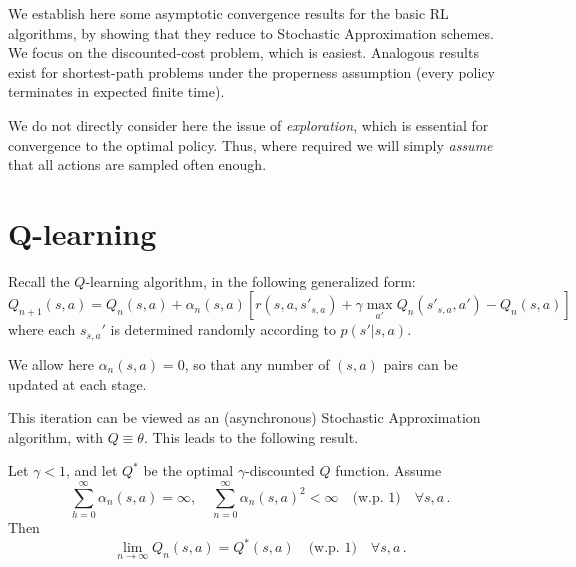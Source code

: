 %
%
%
%
%
%
%
%
%

We establish here some asymptotic convergence results for the basic
RL algorithms, by showing that they reduce to Stochastic Approximation
schemes. We focus on the discounted-cost problem, which is easiest.
Analogous results exist for shortest-path problems under the properness assumption (every policy
terminates in expected finite time).

We do not directly consider here the issue of {\em exploration},
which is essential for convergence to the optimal policy. Thus, where
required we will simply {\em assume} that all actions are sampled
often enough.


\section{Q-learning}

Recall the $Q$-learning algorithm, in the following generalized form:
$$
Q_{n+1} (s,a) = Q_n(s,a) + \alpha_n(s,a)
[r (s,a,s'_{s,a}) + \gamma \max_{{a'}} Q_n (s'_{s,a}, {a'}) - Q_n(s,a)]
$$
where each $s_{s,a}'$ is determined randomly according to
$p(s'|s,a)$.

We allow here $\alpha_n(s,a) = 0$, so that any number of $(s,a)$ pairs can be
updated at each stage.

This iteration can be viewed as an (asynchronous)
Stochastic Approximation algorithm, with $Q\equiv \theta$.
This leads to the following result.

\begin{theorem}
Let $\gamma < 1$, and let  $Q^*$ be the optimal $\gamma$-discounted
$Q$ function. Assume
$$
\sum_{h=0}^\infty \alpha_n (s,a) = \infty, \quad \sum_{n=0}^\infty
\alpha_n(s,a)^2 < \infty \quad
\text{(w.p. 1)} \quad \forall s, a\,.
$$
Then
$$
\lim_{n\to\infty} Q_n(s,a) = Q^* (s,a) \quad \text{(w.p. 1)} \quad \forall s,a \,.
$$
\end{theorem}

